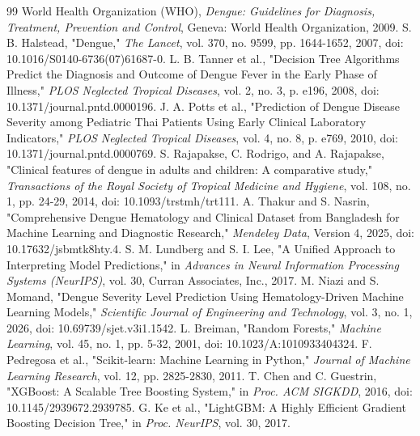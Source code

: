 \documentclass[12pt, a4paper]{report}
\begin{document}
\begin{thebibliography}{99}
 World Health Organization (WHO), \textit{Dengue: Guidelines for Diagnosis, Treatment, Prevention and Control}, Geneva: World Health Organization, 2009.
 S. B. Halstead, "Dengue," \textit{The Lancet}, vol. 370, no. 9599, pp. 1644-1652, 2007, doi: 10.1016/S0140-6736(07)61687-0.
 L. B. Tanner et al., "Decision Tree Algorithms Predict the Diagnosis and Outcome of Dengue Fever in the Early Phase of Illness," \textit{PLOS Neglected Tropical Diseases}, vol. 2, no. 3, p. e196, 2008, doi: 10.1371/journal.pntd.0000196.
 J. A. Potts et al., "Prediction of Dengue Disease Severity among Pediatric Thai Patients Using Early Clinical Laboratory Indicators," \textit{PLOS Neglected Tropical Diseases}, vol. 4, no. 8, p. e769, 2010, doi: 10.1371/journal.pntd.0000769.
 S. Rajapakse, C. Rodrigo, and A. Rajapakse, "Clinical features of dengue in adults and children: A comparative study," \textit{Transactions of the Royal Society of Tropical Medicine and Hygiene}, vol. 108, no. 1, pp. 24-29, 2014, doi: 10.1093/trstmh/trt111.
 A. Thakur and S. Nasrin, "Comprehensive Dengue Hematology and Clinical Dataset from Bangladesh for Machine Learning and Diagnostic Research," \textit{Mendeley Data}, Version 4, 2025, doi: 10.17632/jsbmtk8hty.4.
 S. M. Lundberg and S. I. Lee, "A Unified Approach to Interpreting Model Predictions," in \textit{Advances in Neural Information Processing Systems (NeurIPS)}, vol. 30, Curran Associates, Inc., 2017.
 M. Niazi and S. Momand, "Dengue Severity Level Prediction Using Hematology-Driven Machine Learning Models," \textit{Scientific Journal of Engineering and Technology}, vol. 3, no. 1, 2026, doi: 10.69739/sjet.v3i1.1542.
 L. Breiman, "Random Forests," \textit{Machine Learning}, vol. 45, no. 1, pp. 5-32, 2001, doi: 10.1023/A:1010933404324.
 F. Pedregosa et al., "Scikit-learn: Machine Learning in Python," \textit{Journal of Machine Learning Research}, vol. 12, pp. 2825-2830, 2011.
 T. Chen and C. Guestrin, "XGBoost: A Scalable Tree Boosting System," in \textit{Proc. ACM SIGKDD}, 2016, doi: 10.1145/2939672.2939785.
 G. Ke et al., "LightGBM: A Highly Efficient Gradient Boosting Decision Tree," in \textit{Proc. NeurIPS}, vol. 30, 2017.

\end{thebibliography}
\end{document}
